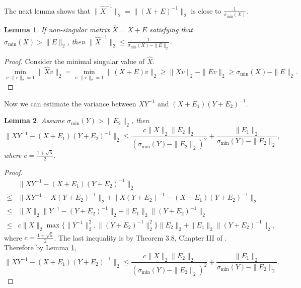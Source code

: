 \documentclass[english]{article} %
\newtheorem{lemma}{Lemma}[section]
\theoremstyle{definition}
\begin{document}
The next lemma shows that $\|\widehat{X}^{-1}\|_2 = \|(X+E)^{-1}\|_2$ is close to $\frac{1}{\sigma_{\min}(X)}$.

\begin{lemma}
\label{lem:inversevariation}
If non-singular matrix $\widehat{X} = X+E$ satisfying that $\sigma_{\min}(X)>\|E\|_2$, then  $\|\widehat{X}^{-1}\|_2 \le \frac{1}{\sigma_{\min}(X)-\|E\|_2}$.
\end{lemma} 
\begin{proof}
Consider the minimal singular value of $\widehat{X}$. 
\[
 \min_{v:\|v\|_2=1} \|\widehat{X}v\|_2 = \min_{v:\|v\|_2=1}\|(X+E)v\|_2 \ge \|Xv\|_2 - \|Ev\|_2 \ge \sigma_{\min}(X) - \|E\|_2.
\]
\end{proof}

Now we can estimate the variance between $XY^{-1}$ and $(X+E_1)(Y+E_2)^{-1}$.
\begin{lemma}
\label{lem:Mvariation}
Assume $\sigma_{\min}(Y) > \|E_2\|_2$, then 
\[
\| XY^{-1} - (X+E_1)(Y+E_2)^{-1}\|_2 \le \frac{c\|X\|_2\|E_2\|_2}{(\sigma_{\min}(Y) - \|E_2\|_2)^2}+\frac{\|E_1\|_2}{\sigma_{\min}(Y) - \|E_2\|_2},
\]
where $c = \frac{1+\sqrt{5}}{2}$.
\end{lemma}
\begin{proof}

\begin{align*}
	& \| XY^{-1} - (X+E_1)(Y+E_2)^{-1}\|_2 \\
\le & \| XY^{-1} - X(Y+E_2)^{-1}\|_2 + \| X(Y+E_2)^{-1} - (X+E_1)(Y+E_2)^{-1}\|_2 \\
\le & \|X\|_2\| Y^{-1} - (Y+E_2)^{-1}\|_2 + \| E_1\|_2 \|(Y+E_2)^{-1}\|_2 \\
\le & c \|X\|_2 \max\{\| Y^{-1}\|^2_2 , \|(Y+E_2)^{-1}\|^2_2\} \|E_2\|_2 + \| E_1\|_2 \|(Y+E_2)^{-1}\|_2,
\end{align*}
where $c = \frac{1+\sqrt{5}}{2}$. The last inequality is by Theorem 3.8, Chapter III of \citep*{stewart1990matrix}. Therefore by Lemma \ref{lem:inversevariation},
\[
\| XY^{-1} - (X+E_1)(Y+E_2)^{-1}\|_2 \le \frac{c\|X\|_2\|E_2\|_2}{(\sigma_{\min}(Y) - \|E_2\|_2)^2}+\frac{\|E_1\|_2}{\sigma_{\min}(Y) - \|E_2\|_2}.
\]
\end{proof}
\end{document}
